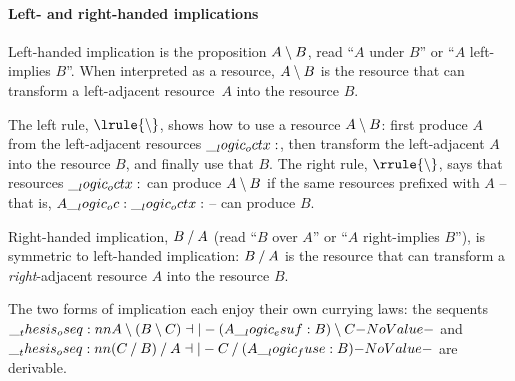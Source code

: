 \paragraph*{Left- and right-handed implications}
Left-handed implication is the proposition $A \mathbin { \setminus } B$, read \enquote{$A$ under $B$} or \enquote{$A$ left-implies $B$}.
When interpreted as a resource, $A \mathbin { \setminus } B$ is the resource that can transform a left-adjacent resource~$A$ into the resource $B$.
The left rule, $\lrule{\limp}$, shows how to use a resource $A \mathbin { \setminus } B$: first produce $A$ from the left-adjacent resources $\__logic_octx:$, then transform the left-adjacent $A$ into the resource $B$, and finally use that $B$.
The right rule, $\rrule{\limp}$, says that resources $\__logic_octx:$ can produce $A \mathbin { \setminus } B$ if the same resources prefixed with $A$ -- that is, $A \__logic_oc: \__logic_octx:$ -- can produce $B$.

Right-handed implication, $B \mathbin { / } A$ (read \enquote{$B$ over $A$} or \enquote{$A$ right-implies $B$}), is symmetric to left-handed implication: $B \mathbin { / } A$ is the resource that can transform a \emph{right}-adjacent resource $A$ into the resource $B$.

The two forms of implication each enjoy their own currying laws: the sequents $\oseq{A \limp (B \limp C) \dashv|- (A \esuf B) \limp C}$ and $\oseq{(C \pmir B) \pmir A \dashv|- C \pmir (A \fuse B)}$ are derivable.




